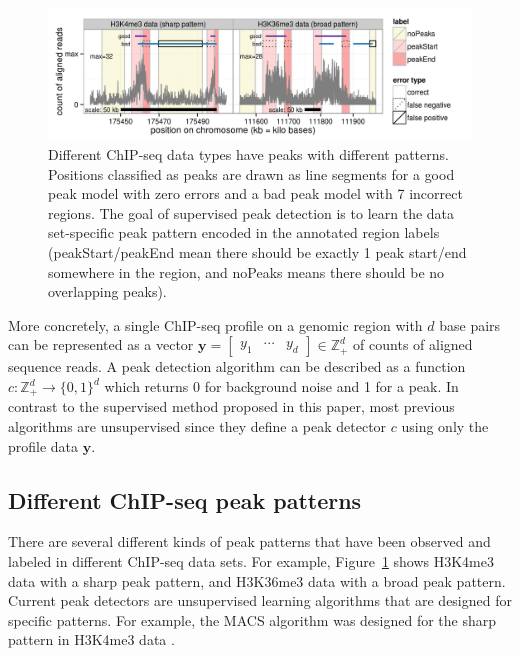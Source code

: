 \documentclass{article}
\newcommand{\ZZ}{\mathbb Z}
\begin{document}
\begin{figure}[b!]
  \centering
  \includegraphics[width=\textwidth]{figure-dp-peaks-train}
  \vskip -0.5cm
  \caption{Different ChIP-seq data types have peaks with different
    patterns. Positions classified as peaks are drawn as line segments
    for a \textcolor{good}{good peak model} with zero errors and a
    \textcolor{bad}{bad peak model} with 7 incorrect regions. The goal
    of supervised peak detection is to learn the data set-specific
    peak pattern encoded in the annotated region labels
    (\colorbox{peakStart}{peakStart}/\colorbox{peakEnd}{peakEnd} mean
    there should be exactly 1 peak start/end somewhere in the region,
    and \colorbox{noPeaks}{noPeaks} means there should be no
    overlapping peaks).}
  \label{fig:dp-peaks-train}
\end{figure}

More concretely, a single ChIP-seq profile on a genomic region with
$d$ base pairs can be represented as a vector $\mathbf y= \left[
  \begin{array}{ccc}
    y_1 & \cdots & y_d
  \end{array}
\right]\in\ZZ_+^d$ of counts of aligned sequence reads. A peak
detection algorithm can be described as a function $c:\ZZ_+^d
\rightarrow \{0, 1\}^d$ which returns 0 for background noise and 1 for
a peak. In contrast to the
supervised method proposed in this paper, most previous algorithms are
unsupervised since they define a peak detector $c$ using only the
profile data $\mathbf y$.


\subsection{Different ChIP-seq peak patterns}

There are several different kinds of peak patterns that have been
observed and labeled in different ChIP-seq data sets. For example,
Figure~\ref{fig:dp-peaks-train} shows H3K4me3 data with a sharp peak
pattern, and H3K36me3 data with a broad peak pattern. Current peak
detectors are unsupervised learning algorithms that are designed for
specific patterns. For example, the MACS algorithm was designed for
the sharp pattern in H3K4me3 data \citep{MACS}.
\end{document}
